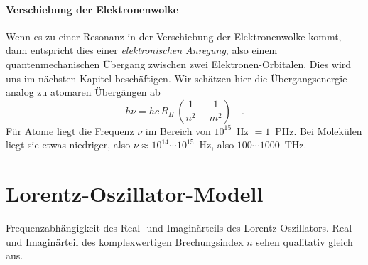 \paragraph{Verschiebung der Elektronenwolke} Wenn es zu einer Resonanz in der Verschiebung der Elektronenwolke kommt, dann entspricht dies einer \emph{elektronischen Anregung}, also einem quantenmechanischen Übergang zwischen zwei Elektronen-Orbitalen. Dies wird uns  im nächsten Kapitel beschäftigen. Wir schätzen hier die Übergangsenergie analog zu atomaren Übergängen ab
\begin{equation}
  h \nu = hc \, R_H \, \left( \frac{1}{n^2} - \frac{1}{m^2} \right) \quad .
\end{equation}
Für Atome liegt die Frequenz $\nu$ im Bereich von $10^{15}$~Hz $= 1$~PHz. Bei Molekülen liegt sie etwas niedriger, also $\nu \approx 10^{14} \cdots 10^{15}$~Hz, also $100 \cdots 1000$~THz.


\section{Lorentz-Oszillator-Modell}


\begin{marginfigure}

\caption{Frequenzabhängigkeit des Real- und Imaginärteils des Lorentz-Oszillators. Real- und  Imaginärteil des komplexwertigen Brechungsindex $\tilde{n}$ sehen qualitativ gleich aus. \label{fig:diel_lorentz}}
\end{marginfigure}

